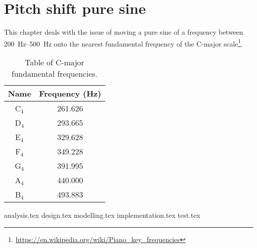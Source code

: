 
\chapter{Pitch shift pure sine}
\label{sec:puresine}

This chapter deals with the issue of moving a pure sine of a frequency between \SIrange{200}{500}{\hertz} onto the nearest fundamental frequency of the C-major scale\footnote{\url{https://en.wikipedia.org/wiki/Piano_key_frequencies}}.

\begin{table}[H]
	\centering
	\begin{tabular}{c c}
		\toprule
		Name & Frequency (\si{\hertz}) \\
		\midrule
		C$_4$ & \num{261.626} \\
		D$_4$ & \num{293.665} \\
		E$_4$ & \num{329.628} \\
		F$_4$ & \num{349.228} \\
		G$_4$ & \num{391.995} \\
		A$_4$ & \num{440.000} \\
		B$_4$ & \num{493.883} \\
		\bottomrule
	\end{tabular}
	\caption{Table of C-major fundamental frequencies.}
	\label{tab:cmajor}
\end{table}

{analysis.tex}
{design.tex}
{modelling.tex}
{implementation.tex}
{test.tex}